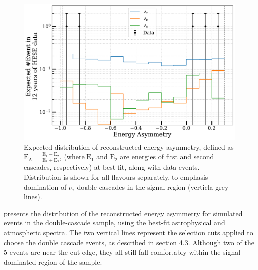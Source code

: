 \begin{figure}
    
    \includegraphics{./figures/results/Energy_ratio.pdf}
    
    \caption{Expected distribution of reconstructed energy asymmetry, defined as $\mathrm{E}_{\mathrm{A}}=\frac{\mathrm{E}_1-\mathrm{E}_2}{\mathrm{E}_1+\mathrm{E}_2}$, (where $\mathrm{E}_1$ and $\mathrm{E}_2$ are energies of first and second cascades, respectively) at best-fit, along with data events. Distribution is shown for all flavours separately, to emphasis domination of $\nu_{\tau}$ double cascades in the signal region (verticla grey lines).}
\end{figure}

 presents the distribution of the reconstructed energy asymmetry for simulated events in the double-cascade sample, using the best-fit astrophysical and atmospheric spectra. The two vertical lines represent the selection cuts applied to choose the double cascade events, as described in section 4.3. Although two of the 5 events are near the cut edge, they all still fall comfortably within the signal-dominated region of the sample.


